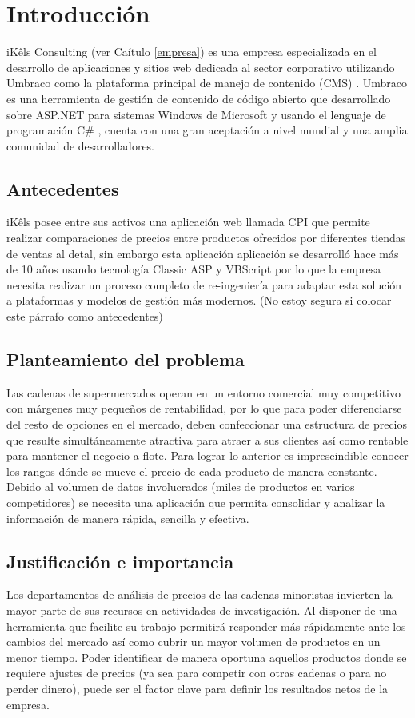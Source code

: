 \chapter*{Introducción}
iKêls Consulting (ver Caítulo \ref{empresa}) es una empresa especializada en el desarrollo de aplicaciones y sitios web dedicada al sector corporativo utilizando Umbraco como la plataforma principal de manejo de contenido (CMS) \cite{cmsBarker}. Umbraco es una herramienta de gestión de contenido de código abierto que desarrollado sobre ASP.NET \cite{aspMicrosoft} para sistemas Windows de Microsoft y usando el lenguaje de programación C\# \cite{cSharpMicrosoft}, cuenta con una gran aceptación a nivel mundial y una amplia comunidad de desarrolladores.

\section*{Antecedentes}
 iKêls posee entre sus activos una aplicación web llamada CPI que permite realizar comparaciones de precios entre productos ofrecidos por diferentes tiendas de ventas al detal, sin embargo esta aplicación aplicación se desarrolló hace más de 10 años usando tecnología Classic ASP y VBScript por lo que la empresa necesita realizar un proceso completo de re-ingeniería para adaptar esta solución a plataformas y modelos de gestión más modernos. (No estoy segura si colocar este párrafo como antecedentes)


\section*{Planteamiento del problema}
Las cadenas de supermercados operan en un entorno comercial muy competitivo con márgenes muy pequeños de rentabilidad, por lo que para poder diferenciarse del resto de opciones en el mercado, deben confeccionar una estructura de precios que resulte simultáneamente atractiva para atraer a sus clientes así como rentable para mantener el negocio a flote.
Para lograr lo anterior es imprescindible conocer los rangos dónde  se mueve el precio de cada producto de manera constante. Debido al volumen de datos involucrados (miles de productos en varios competidores) se necesita una aplicación que permita consolidar y analizar la información de manera rápida, sencilla y efectiva.
\section*{Justificación e importancia}
Los departamentos de análisis de precios de las cadenas minoristas invierten la mayor parte de sus recursos en actividades de investigación.
Al disponer de una herramienta que facilite su trabajo permitirá responder más rápidamente ante los cambios del mercado así como cubrir un mayor volumen de productos en un menor  tiempo. Poder identificar de manera oportuna aquellos productos donde se requiere ajustes de precios (ya sea para competir con otras cadenas o para no perder dinero), puede ser el factor clave para definir los resultados netos de la empresa.
